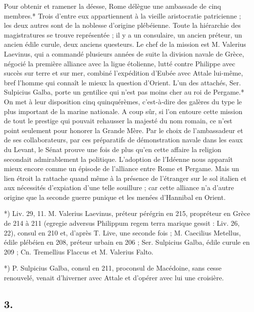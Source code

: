 \documentclass[a4paper, 11pt, oneside, polutonikogreek, french]{article}
\begin{document}
Pour obtenir et ramener la déesse, Rome délègue une ambassade de cinq membres.* Trois d'entre eux appartiennent à la vieille aristocratie patricienne ; les deux autres sont de la noblesse d'origine plébéienne. Toute la hiérarchie des magistratures se trouve représentée ; il y a un consulaire, un ancien préteur, un ancien édile curule, deux anciens questeurs. Le chef de la mission est M. Valerius Laevinus, qui a commandé plusieurs années de suite la division navale de Grèce, négocié la première alliance avec la ligue étolienne, lutté contre Philippe avec succès sur terre et sur mer, combiné l'expédition d'Eubée avec Attale lui-même, bref l'homme qui connaît le mieux la question d'Orient. L'un des attachés, Ser. Sulpicius Galba, porte un gentilice qui n'est pas moins cher au roi de Pergame.* On met à leur disposition cinq quinquérèmes, c'est-à-dire des galères du type le plus important de la marine nationale. A coup sûr, si l'on entoure cette mission de tout le prestige qui pouvait rehausser la majesté du nom romain, ce n'est point seulement pour honorer la Grande Mère. Par le choix de l'ambassadeur et de ses collaborateurs, par ces préparatifs de démonstration navale dans les eaux du Levant, le Sénat prouve une fois de plus qu'en cette affaire la religion secondait admirablement la politique. L'adoption de l'Idéenne nous apparaît mieux encore comme un épisode de l'alliance entre Rome et Pergame. Mais un lien étroit la rattache quand même à la présence de l'étranger sur le sol italien et aux nécessités d'expiation d'une telle souillure ; car cette alliance n'a d'autre origine que la seconde guerre punique et les menées d'Hannibal en Orient.

*) Liv.  29, 11. M. Valerius Laevinus, préteur pérégrin en 215, propréteur en Grèce de 214 à 211 (egregie adversus Philippum regem terra marique gessit : Liv. 26, 22), consul en 210 et, d'après T. Live, une seconde fois ; M. Caecilius Metellus, édile plébéien en 208, préteur urbain en 206 ; Ser. Sulpicius Galba, édile curule en 209 ; Cn. Tremellius Flaccus et M. Valerius Falto.

*) P. Sulpicius Galba, consul en 211, proconsul de Macédoine, sans cesse renouvelé, venait d'hiverner avec Attale et d'opérer avec lui une croisière.

\subsection{3.}
\end{document}
